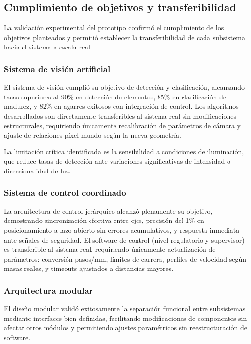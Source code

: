 \subsection{Cumplimiento de objetivos y transferibilidad}

La validación experimental del prototipo confirmó el cumplimiento de los objetivos planteados y permitió establecer la transferibilidad de cada subsistema hacia el sistema a escala real.

\subsubsection{Sistema de visión artificial}

El sistema de visión cumplió su objetivo de detección y clasificación, alcanzando tasas superiores al 90\% en detección de elementos, 85\% en clasificación de madurez, y 82\% en agarres exitosos con integración de control. Los algoritmos desarrollados son directamente transferibles al sistema real sin modificaciones estructurales, requiriendo únicamente recalibración de parámetros de cámara y ajuste de relaciones píxel-mundo según la nueva geometría.

La limitación crítica identificada es la sensibilidad a condiciones de iluminación, que reduce tasas de detección ante variaciones significativas de intensidad o direccionalidad de luz.

\subsubsection{Sistema de control coordinado}

La arquitectura de control jerárquico alcanzó plenamente su objetivo, demostrando sincronización efectiva entre ejes, precisión del 1\% en posicionamiento a lazo abierto sin errores acumulativos, y respuesta inmediata ante señales de seguridad. El software de control (nivel regulatorio y supervisor) es transferible al sistema real, requiriendo únicamente actualización de parámetros: conversión pasos/mm, límites de carrera, perfiles de velocidad según masas reales, y timeouts ajustados a distancias mayores.

\subsubsection{Arquitectura modular}

El diseño modular validó exitosamente la separación funcional entre subsistemas mediante interfaces bien definidas, facilitando modificaciones de componentes sin afectar otros módulos y permitiendo ajustes paramétricos sin reestructuración de software.

